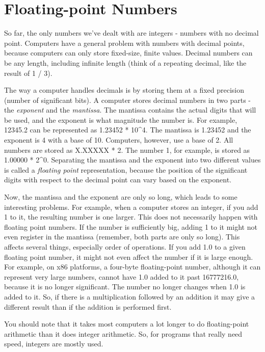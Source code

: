  
\section{Floating-point Numbers}
\label{floatingpoint}

So far, the only numbers we've dealt with are integers - numbers
with no decimal point.  Computers have a general problem with
numbers with decimal points, because computers can only store
fixed-size, finite values.  Decimal numbers can be any length, including
infinite length (think of a repeating decimal, like the result of
1 / 3).

The way a computer handles decimals is by storing them
at a fixed precision (number of significant bits).  
A computer stores decimal numbers in two
parts - the \emph{exponent} and the \emph{mantissa}.  The mantissa contains the actual
digits that will be used, and the exponent is what magnitude the number
is.  For example, 12345.2 can be represented as 1.23452 * 10\textasciicircum4.  The mantissa
is 1.23452 and the exponent is 4 with a base of 10.  Computers, however, 
use a base of 2.  All numbers are stored
as X.XXXXX * 2\textasciicircumXXXX.  The number 1, for example, is stored as 1.00000 * 2\textasciicircum0.
Separating the mantissa and the exponent into two different values is called
a \emph{floating point} representation, because the position of the significant digits with respect to the decimal point can vary based on the exponent.

Now, the mantissa and the exponent are only so long, which leads to some 
interesting problems.  For example, when a computer
stores an integer, if you add 1 to it, the resulting number is one larger.
This does not necessarily happen with floating point numbers.  If the
number is sufficiently big, adding 1 to it might
not even register in the mantissa (remember, both parts are only so long).
This affects several things, especially order of operations.  If you
add 1.0 to a given floating point number, it might not even affect the number
if it is large enough.  For example, on x86 platforms, a four-byte 
floating-point number, although it can represent very large numbers, cannot
have 1.0 added to it past 16777216.0, because it is no longer significant.
The number no longer changes when 1.0 is added to it.  So, if there is
a multiplication followed by an addition it may give a different result than
if the addition is performed first.

You should note that it takes most computers a lot longer
to do floating-point arithmetic than it does integer arithmetic.  So,
for programs that really need speed, integers are mostly used.  


